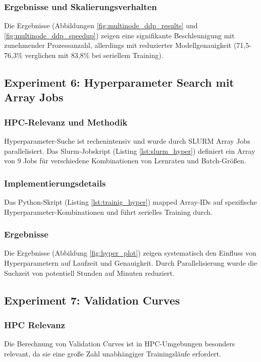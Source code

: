 \documentclass{article}
\begin{document}
\subsubsection{Ergebnisse und Skalierungsverhalten}
Die Ergebnisse (Abbildungen \ref{fig:multinode_ddp_results} und \ref{fig:multinode_ddp_speedup}) zeigen eine signifikante Beschleunigung 
mit zunehmender Prozessanzahl, allerdings mit reduzierter Modellgenauigkeit (71,5-76,3\% verglichen mit 83,8\% bei seriellem Training).

\subsection{Experiment 6: Hyperparameter Search mit Array Jobs}
\subsubsection{HPC-Relevanz und Methodik}
Hyperparameter-Suche ist rechenintensiv und wurde durch SLURM Array Jobs parallelisiert. Das Slurm-Jobskript (Listing \ref{lst:slurm_hyper}) 
definiert ein Array von 9 Jobs für verschiedene Kombinationen von Lernraten und Batch-Größen.

\subsubsection{Implementierungsdetails}
Das Python-Skript (Listing \ref{lst:trainig_hyper}) mapped Array-IDs auf spezifische Hyperparameter-Kombinationen und führt serielles Training 
durch.

\subsubsection{Ergebnisse}
Die Ergebnisse (Abbildung \ref{fig:hyper_plot}) zeigen systematisch den Einfluss von Hyperparametern auf Laufzeit und Genauigkeit. Durch 
Parallelisierung wurde die Suchzeit von potentiell Stunden auf Minuten reduziert.

\subsection{Experiment 7: Validation Curves}
\subsubsection{HPC Relevanz}
Die Berechnung von Validation Curves ist in HPC-Umgebungen besonders relevant, 
da sie eine große Zahl unabhängiger Trainingsläufe erfordert.
\end{document}
